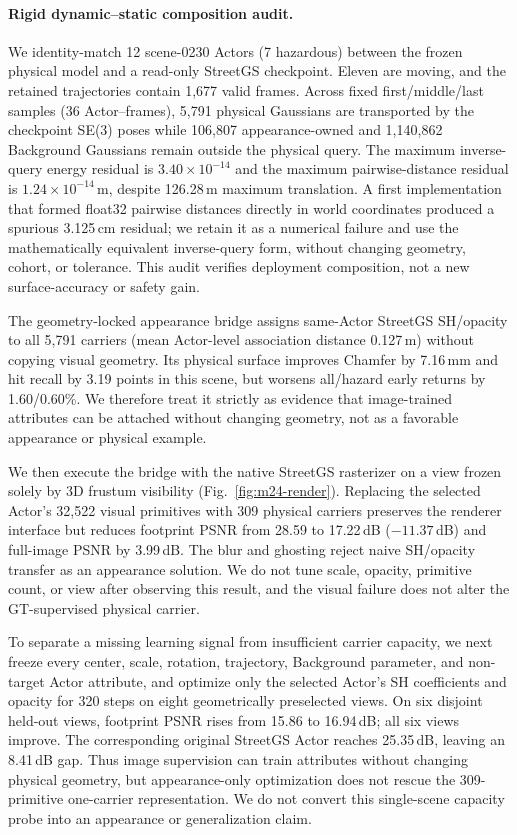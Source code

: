\paragraph{Rigid dynamic--static composition audit.}
We identity-match 12 scene-0230 Actors (7 hazardous) between the frozen physical model and a read-only StreetGS checkpoint. Eleven are moving, and the retained trajectories contain 1,677 valid frames. Across fixed first/middle/last samples (36 Actor--frames), 5,791 physical Gaussians are transported by the checkpoint SE(3) poses while 106,807 appearance-owned and 1,140,862 Background Gaussians remain outside the physical query. The maximum inverse-query energy residual is $3.40\times10^{-14}$ and the maximum pairwise-distance residual is $1.24\times10^{-14}$\,m, despite 126.28\,m maximum translation. A first implementation that formed float32 pairwise distances directly in world coordinates produced a spurious 3.125\,cm residual; we retain it as a numerical failure and use the mathematically equivalent inverse-query form, without changing geometry, cohort, or tolerance. This audit verifies deployment composition, not a new surface-accuracy or safety gain.

The geometry-locked appearance bridge assigns same-Actor StreetGS SH/opacity to all 5,791 carriers (mean Actor-level association distance 0.127\,m) without copying visual geometry. Its physical surface improves Chamfer by 7.16\,mm and hit recall by 3.19 points in this scene, but worsens all/hazard early returns by 1.60/0.60\%. We therefore treat it strictly as evidence that image-trained attributes can be attached without changing geometry, not as a favorable appearance or physical example.

We then execute the bridge with the native StreetGS rasterizer on a view frozen solely by 3D frustum visibility (Fig.~\ref{fig:m24-render}). Replacing the selected Actor's 32,522 visual primitives with 309 physical carriers preserves the renderer interface but reduces footprint PSNR from 28.59 to 17.22\,dB ($-11.37$\,dB) and full-image PSNR by 3.99\,dB. The blur and ghosting reject naive SH/opacity transfer as an appearance solution. We do not tune scale, opacity, primitive count, or view after observing this result, and the visual failure does not alter the GT-supervised physical carrier.

To separate a missing learning signal from insufficient carrier capacity, we next freeze every center, scale, rotation, trajectory, Background parameter, and non-target Actor attribute, and optimize only the selected Actor's SH coefficients and opacity for 320 steps on eight geometrically preselected views. On six disjoint held-out views, footprint PSNR rises from 15.86 to 16.94\,dB; all six views improve. The corresponding original StreetGS Actor reaches 25.35\,dB, leaving an 8.41\,dB gap. Thus image supervision can train attributes without changing physical geometry, but appearance-only optimization does not rescue the 309-primitive one-carrier representation. We do not convert this single-scene capacity probe into an appearance or generalization claim.

